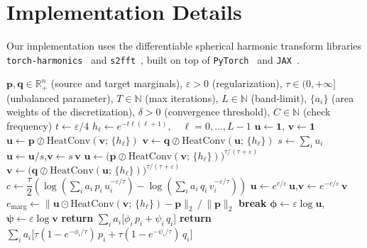 \documentclass{article}
\theoremstyle{plain}
\theoremstyle{definition}
\theoremstyle{remark}
\renewcommand{\vector}[1]{\mathrm{\mathbf{#1}}}
\begin{document}
\section{Implementation Details}\label{appendix:implementation_details}
Our implementation uses the differentiable spherical harmonic transform libraries \texttt{torch-harmonics}~\cite{bonev2023spherical} and \texttt{s2fft}~\cite{price2024differentiable}, built on top of \texttt{PyTorch}~\cite{paszke2019pytorch} and \texttt{JAX}~\cite{jax2018github}.

\begin{algorithm}[H]
\caption{Spherical Harmonic Sinkhorn}
\label{alg:sinkhorn}
\begin{algorithmic}[1]
\REQUIRE $\vector{p}, \vector{q} \in \mathbb{R}^n_+$ (source and target marginals), $\varepsilon > 0$ (regularization), $\tau \in (0, +\infty]$ (unbalanced parameter), $T \in \mathbb{N}$ (max iterations), $L \in \mathbb{N}$ (band-limit), $\lbrace a_i\rbrace$ (area weights of the discretization), $\delta > 0$ (convergence threshold), $C \in \mathbb{N}$ (check frequency)
\STATE $t \leftarrow \varepsilon/4$
\STATE $h_\ell \leftarrow e^{-t\ell(\ell+1)},\quad \ell = 0, \ldots, L-1$
\STATE $\vector{u} \leftarrow \mathbf{1}$, $\vector{v} \leftarrow \mathbf{1}$
    \IF{$\tau = +\infty$}
        \STATE $\vector{u} \leftarrow \vector{p} \oslash \mathrm{HeatConv}(\vector{v};\,\{h_\ell\})$            \hfill{}
        \STATE $\vector{v} \leftarrow \vector{q} \oslash \mathrm{HeatConv}(\vector{u};\,\{h_\ell\})$
        \STATE $s \leftarrow \textstyle\sum_i u_i$ 
        \STATE $\vector{u} \leftarrow \vector{u}/s$,\quad $\vector{v} \leftarrow s\,\vector{v}$
    \ELSE
        \STATE $\vector{u} \leftarrow \bigl(\vector{p} \oslash \mathrm{HeatConv}(\vector{v};\,\{h_\ell\})\bigr)^{\tau/(\tau+\varepsilon)}$
        \STATE $\vector{v} \leftarrow \bigl(\vector{q} \oslash \mathrm{HeatConv}(\vector{u};\,\{h_\ell\})\bigr)^{\tau/(\tau+\varepsilon)}$
        \STATE $c \leftarrow \dfrac{\tau}{2}\left(\log\left(\sum_i a_i\,p_i\,u_i^{-\varepsilon/\tau}\right) - \log \left(\sum_i a_i\,q_i\,v_i^{-\varepsilon/\tau}\right)\right)$
        \STATE $\vector{u} \leftarrow e^{c/\varepsilon}\,\vector{u}$,\quad $\vector{v} \leftarrow e^{-c/\varepsilon}\,\vector{v}$
    \ENDIF
        \STATE $e_{\mathrm{marg}} \leftarrow \bigl\|\vector{u} \odot \mathrm{HeatConv}(\vector{v};\,\{h_\ell\}) - \vector{p}\bigr\|_2 \,/\, \|\vector{p}\|_2$
            \STATE \textbf{break}
        \ENDIF
    \ENDIF
\ENDFOR
\STATE $\vector{\phi} \leftarrow \varepsilon \log \vector{u}$,\quad $\vector{\psi} \leftarrow \varepsilon \log \vector{v}$
\IF{$\tau = +\infty$}
    \STATE \textbf{return} $\sum_i a_i \bigl[\phi_i\,p_i + \psi_i\,q_i\bigr]$
\ELSE
    \STATE \textbf{return} $\sum_i a_i \bigl[\tau(1 - e^{-\phi_i/\tau})\,p_i + \tau(1 - e^{-\psi_i/\tau})\,q_i\bigr]$
\ENDIF
\end{algorithmic}
\end{algorithm}
\end{document}
